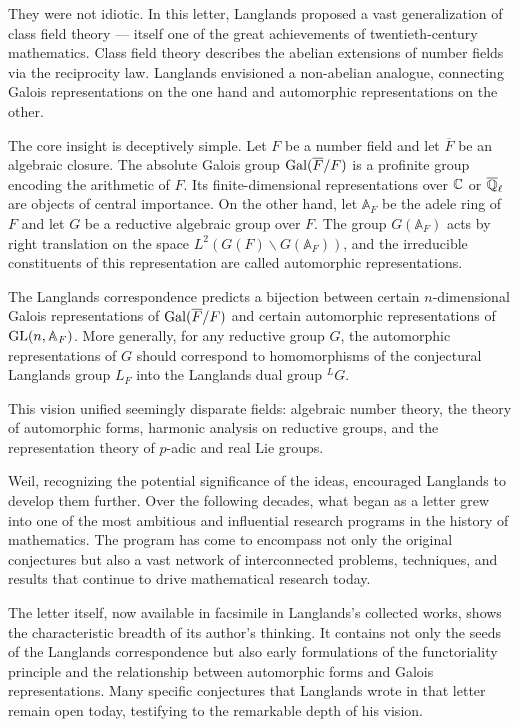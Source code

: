They were not idiotic. In this letter, Langlands proposed a vast generalization of class field theory --- itself one of the great achievements of twentieth-century mathematics. Class field theory describes the abelian extensions of number fields via the reciprocity law. Langlands envisioned a non-abelian analogue, connecting Galois representations on the one hand and automorphic representations on the other.

The core insight is deceptively simple. Let \(F\) be a number field and let \(\overline{F}\) be an algebraic closure. The absolute Galois group \(\operatorname{Gal}(\overline{F}/F)\) is a profinite group encoding the arithmetic of \(F\). Its finite-dimensional representations over \(\mathbb{C}\) or \(\overline{\mathbb{Q}}_\ell\) are objects of central importance. On the other hand, let \(\mathbb{A}_F\) be the adele ring of \(F\) and let \(G\) be a reductive algebraic group over \(F\). The group \(G(\mathbb{A}_F)\) acts by right translation on the space \(L^2(G(F)\backslash G(\mathbb{A}_F))\), and the irreducible constituents of this representation are called automorphic representations.

The Langlands correspondence predicts a bijection between certain \(n\)-dimensional Galois representations of \(\operatorname{Gal}(\overline{F}/F)\) and certain automorphic representations of \(\operatorname{GL}(n,\mathbb{A}_F)\). More generally, for any reductive group \(G\), the automorphic representations of \(G\) should correspond to homomorphisms of the conjectural Langlands group \(L_F\) into the Langlands dual group \({}^L G\).

This vision unified seemingly disparate fields: algebraic number theory, the theory of automorphic forms, harmonic analysis on reductive groups, and the representation theory of \(p\)-adic and real Lie groups.

Weil, recognizing the potential significance of the ideas, encouraged Langlands to develop them further. Over the following decades, what began as a letter grew into one of the most ambitious and influential research programs in the history of mathematics. The program has come to encompass not only the original conjectures but also a vast network of interconnected problems, techniques, and results that continue to drive mathematical research today.

The letter itself, now available in facsimile in Langlands's collected works, shows the characteristic breadth of its author's thinking. It contains not only the seeds of the Langlands correspondence but also early formulations of the functoriality principle and the relationship between automorphic forms and Galois representations. Many specific conjectures that Langlands wrote in that letter remain open today, testifying to the remarkable depth of his vision.

